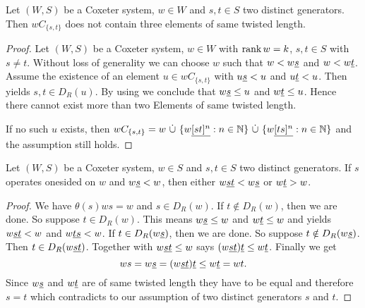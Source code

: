 \begin{lemm}
	\label{rank-2-residuums-are-convex} Let $(W,S)$ be a Coxeter system, $w \in W$ and $s,t \in S$ two distinct generators. Then $wC_{\{s,t\}}$ does not contain three elements of same twisted length.

	\begin{proof}
		Let $(W,S)$ be a Coxeter system, $w \in W$ with $\operatorname{rank} w = k$, $s, t \in S$ with $s \neq t$. Without loss of generality we can choose $w$ such that $w < w \underline{s}$ and $w < w \underline{t}$. Assume the existence of an element $u \in wC_{\{s,t\}}$ with $u \underline{s} < u$ and $u \underline{t} < u$. Then \cite[Lemma 3.8]{hultman:comb-twisted-invo} yields $s,t \in D_R(u)$. By using \cite[Lemma 3.9]{hultman:comb-twisted-invo} we conclude that $w \underline{s} \leq u$ and $w \underline{t} \leq u$. Hence there cannot exist more than two Elements of same twisted length.

		If no such $u$ exists, then $wC_{\{s,t\}} = w \ \dot \cup \ \{ w \ul{[st]^n} : n \in \nn \} \ \dot \cup \ \{ w \ul{[ts]^n} : n \in \nn \}$ and the assumption still holds.
	\end{proof}
\end{lemm}

\begin{lemm}
	\label{onesided-operations-only-at-top-or-bottom-end-of-twocycle}
	Let $(W,S)$ be a Coxeter system, $w \in S$ and $s,t \in S$ two distinct generators. If $s$ operates onesided on $w$ and $w \underline{s} < w$, then either $w \underline{st} < w \underline{s}$ or $w \underline{t} > w$.

	\begin{proof}
		We have $\theta(s)ws = w$ and $s \in D_R(w)$. If $t \notin D_R(w)$, then we are done. So suppose $t \in D_R(w)$. This means $w \underline{s} \leq w$ and $w \underline{t} \leq w$ and \cite[Lemma 3.9]{hultman:comb-twisted-invo} yields $w \underline{st} < w$ and $w \underline{ts} < w$. If $t \in D_R(w \underline{s})$, then we are done. So suppose $t \notin D_R(w \underline{s})$. Then $t \in D_R(w \underline{st})$. Together with $w \underline{st} \leq w$ \cite[Lemma 3.9(2)]{hultman:comb-twisted-invo} says $(w \underline{st}) \underline{t} \leq w \underline{t}$. Finally we get
		$$ ws = w \underline{s} = (w \underline{st}) \underline{t} \leq w \underline{t} = wt.$$
		Since $w \underline{s}$ and $w \underline{t}$ are of same twisted length they have to be equal and therefore $s = t$ which contradicts to our assumption of two distinct generators $s$ and $t$.
	\end{proof}
\end{lemm}